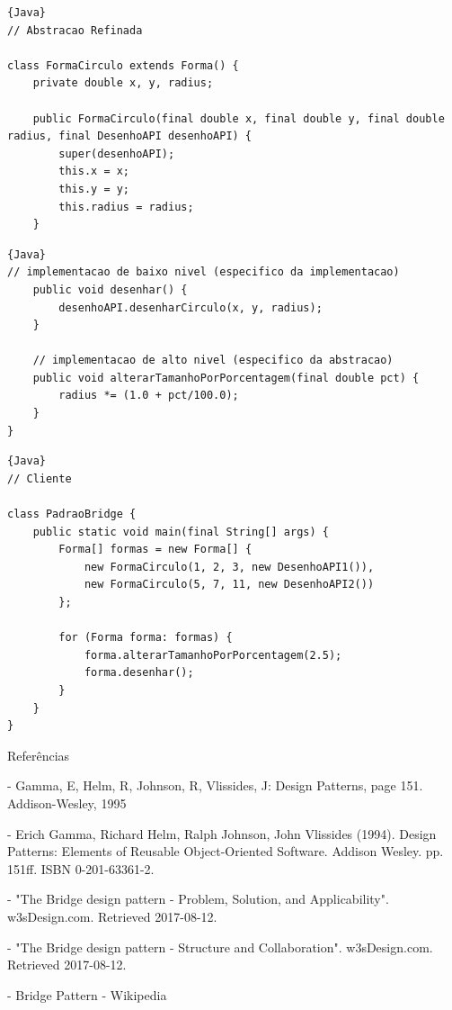 \documentclass{beamer}
\begin{document}
  \begin{frame}[fragile]
  \begin{lstlisting}{Java}
// Abstracao Refinada

class FormaCirculo extends Forma() {
    private double x, y, radius;

    public FormaCirculo(final double x, final double y, final double radius, final DesenhoAPI desenhoAPI) {
        super(desenhoAPI);
        this.x = x;
        this.y = y;
        this.radius = radius;
    }
    \end{lstlisting}
  \end{frame}

  \begin{frame}[fragile]
  \begin{lstlisting}{Java}
// implementacao de baixo nivel (especifico da implementacao)
    public void desenhar() {
        desenhoAPI.desenharCirculo(x, y, radius);
    }

    // implementacao de alto nivel (especifico da abstracao)
    public void alterarTamanhoPorPorcentagem(final double pct) {
        radius *= (1.0 + pct/100.0);
    }
}
    \end{lstlisting}
  \end{frame}

  \begin{frame}[fragile]
  \begin{lstlisting}{Java}
// Cliente

class PadraoBridge {
    public static void main(final String[] args) {
        Forma[] formas = new Forma[] {
            new FormaCirculo(1, 2, 3, new DesenhoAPI1()),
            new FormaCirculo(5, 7, 11, new DesenhoAPI2())
        };

        for (Forma forma: formas) {
            forma.alterarTamanhoPorPorcentagem(2.5);
            forma.desenhar();
        }
    }
}
    \end{lstlisting}
  \end{frame}

\begin{frame}{Referências}

- Gamma, E, Helm, R, Johnson, R, Vlissides, J: Design Patterns, page 151. Addison-Wesley, 1995

- Erich Gamma, Richard Helm, Ralph Johnson, John Vlissides (1994). Design Patterns: Elements of Reusable Object-Oriented Software. Addison Wesley. pp. 151ff. ISBN 0-201-63361-2.

- "The Bridge design pattern - Problem, Solution, and Applicability". w3sDesign.com. Retrieved 2017-08-12.

- "The Bridge design pattern - Structure and Collaboration". w3sDesign.com. Retrieved 2017-08-12.

- Bridge Pattern - Wikipedia

\end{frame}
\end{document}
